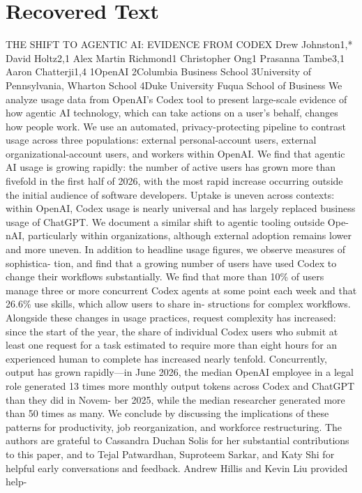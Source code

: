\section{Recovered Text}
THE SHIFT TO AGENTIC AI: EVIDENCE
FROM CODEX
Drew Johnston1,*
David Holtz2,1
Alex Martin Richmond1
Christopher Ong1
Prasanna Tambe3,1
Aaron Chatterji1,4
1OpenAI
2Columbia Business School
3University of Pennsylvania, Wharton School
4Duke University Fuqua School of Business
We analyze usage data from OpenAI’s Codex tool to present large-scale evidence of how
agentic AI technology, which can take actions on a user’s behalf, changes how people
work. We use an automated, privacy-protecting pipeline to contrast usage across three
populations: external personal-account users, external organizational-account users, and
workers within OpenAI. We find that agentic AI usage is growing rapidly: the number
of active users has grown more than fivefold in the first half of 2026, with the most rapid
increase occurring outside the initial audience of software developers. Uptake is uneven
across contexts: within OpenAI, Codex usage is nearly universal and has largely replaced
business usage of ChatGPT. We document a similar shift to agentic tooling outside Ope-
nAI, particularly within organizations, although external adoption remains lower and
more uneven. In addition to headline usage figures, we observe measures of sophistica-
tion, and find that a growing number of users have used Codex to change their workflows
substantially. We find that more than 10\% of users manage three or more concurrent Codex
agents at some point each week and that 26.6\% use skills, which allow users to share in-
structions for complex workflows. Alongside these changes in usage practices, request
complexity has increased: since the start of the year, the share of individual Codex users
who submit at least one request for a task estimated to require more than eight hours for
an experienced human to complete has increased nearly tenfold. Concurrently, output has
grown rapidly—in June 2026, the median OpenAI employee in a legal role generated 13
times more monthly output tokens across Codex and ChatGPT than they did in Novem-
ber 2025, while the median researcher generated more than 50 times as many. We conclude
by discussing the implications of these patterns for productivity, job reorganization, and
workforce restructuring.
The authors are grateful to Cassandra Duchan Solis for her substantial contributions to this paper, and to Tejal Patwardhan,
Suproteem Sarkar, and Katy Shi for helpful early conversations and feedback. Andrew Hillis and Kevin Liu provided help-
